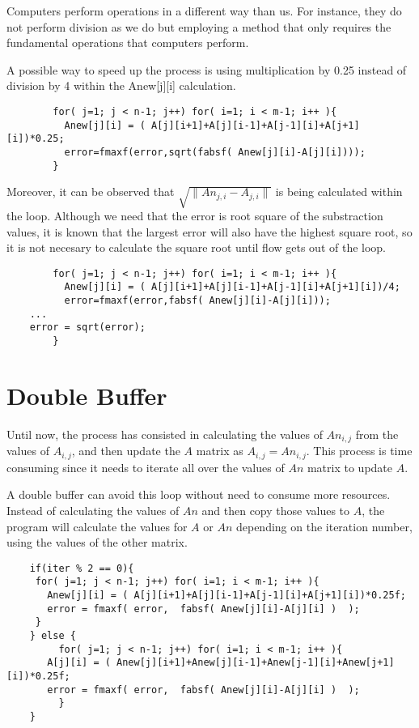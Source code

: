 \documentclass{article}
\begin{document}
	Computers perform operations in a different way than us. For instance,
	they do not perform division as we do but employing a method
	that only requires the fundamental operations that computers perform.
	
	A possible way to speed up the process is using multiplication
	by 0.25 instead of division by 4 within the Anew[j][i] calculation.

	
	\begin{verbatim}
        for( j=1; j < n-1; j++) for( i=1; i < m-1; i++ ){
          Anew[j][i] = ( A[j][i+1]+A[j][i-1]+A[j-1][i]+A[j+1][i])*0.25;
          error=fmaxf(error,sqrt(fabsf( Anew[j][i]-A[j][i])));
        }
	\end{verbatim}
	
	Moreover, it can be observed that $\sqrt{\|An_{j,i} - A_{j,i}\|}$
	is being calculated within the loop. Although we need that
	the error is root square of the substraction values, it is
	known that the largest error will also have the highest square root,
	so it is not necesary to calculate the square root until 
	flow gets out of the loop.

	\begin{verbatim}
        for( j=1; j < n-1; j++) for( i=1; i < m-1; i++ ){
          Anew[j][i] = ( A[j][i+1]+A[j][i-1]+A[j-1][i]+A[j+1][i])/4;
          error=fmaxf(error,fabsf( Anew[j][i]-A[j][i]));
	...
	error = sqrt(error);
        }
	\end{verbatim}
	
\section {Double Buffer}

	Until now, the process has consisted in calculating
	the values of $An_{i,j}$ from the values of $A_{i,j}$, and
	then update the $A$ matrix as $A_{i,j}=An_{i,j}$. This process
	is time consuming since it needs to iterate all over the
	values of $An$ matrix to update $A$.

	A double buffer can avoid this loop without need to
	consume more resources. Instead of calculating the values
	of $An$ and then copy those values to $A$, the program
	will calculate the values for $A$ or $An$ depending
	on the iteration number, using the values of the other
	matrix.


	\begin{verbatim}
	if(iter % 2 == 0){
	 for( j=1; j < n-1; j++) for( i=1; i < m-1; i++ ){
	   Anew[j][i] = ( A[j][i+1]+A[j][i-1]+A[j-1][i]+A[j+1][i])*0.25f;
	   error = fmaxf( error,  fabsf( Anew[j][i]-A[j][i] )  );
	 }
	} else {
         for( j=1; j < n-1; j++) for( i=1; i < m-1; i++ ){
	   A[j][i] = ( Anew[j][i+1]+Anew[j][i-1]+Anew[j-1][i]+Anew[j+1][i])*0.25f;
	   error = fmaxf( error,  fabsf( Anew[j][i]-A[j][i] )  );
         }
	}
	\end{verbatim}
\end{document}
